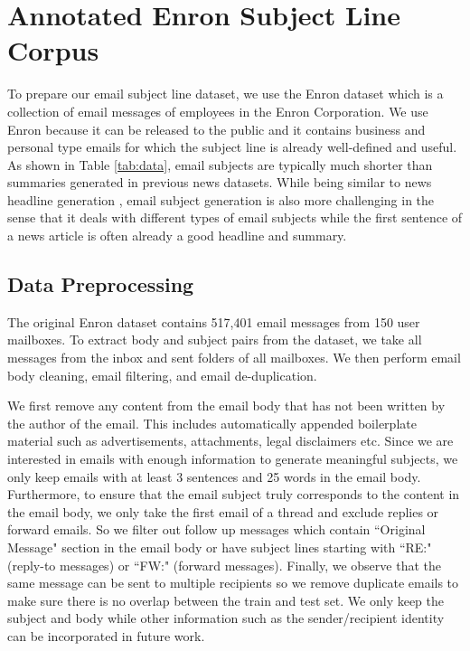 \documentclass[11pt,a4paper]{article}
\begin{document}
\section{Annotated Enron Subject Line Corpus}
To prepare our email subject line dataset, we use the Enron dataset \cite{klimt2004enron} which is a collection of email messages of employees in the Enron Corporation.
We use Enron because it can be released to the public and it contains business and personal type emails for which the subject line is already well-defined and useful.
As shown in Table \ref{tab:data}, email subjects are typically much shorter than summaries generated in previous news datasets.
While being similar to news headline generation \cite{rush2015neural}, email subject generation is also more challenging in the sense that it deals with different types of email subjects while the first sentence of a news article is often already a good headline and summary.

\subsection{Data Preprocessing}
The original Enron dataset contains 517,401 email messages from 150 user mailboxes.
To extract body and subject pairs from the dataset, we take all messages from the inbox and sent folders of all mailboxes.
We then perform email body cleaning, email filtering, and email de-duplication.

We first remove any content from the email body that has not been written by the author of the email.
This includes automatically appended boilerplate material such as advertisements, attachments, legal disclaimers etc.
Since we are interested in emails with enough information to generate meaningful subjects, we only keep emails with at least 3 sentences and 25 words in the email body.
Furthermore, to ensure that the email subject truly corresponds to the content in the email body, we only take the first email of a thread and exclude replies or forward emails.
So we filter out follow up messages which contain ``Original Message" section in the email body or have subject lines starting with ``RE:" (reply-to messages) or ``FW:" (forward messages).
Finally, we observe that the same message can be sent to multiple recipients so we remove duplicate emails to make sure there is no overlap between the train and test set.
We only keep the subject and body while other information such as the sender/recipient identity can be incorporated in future work.
\end{document}
